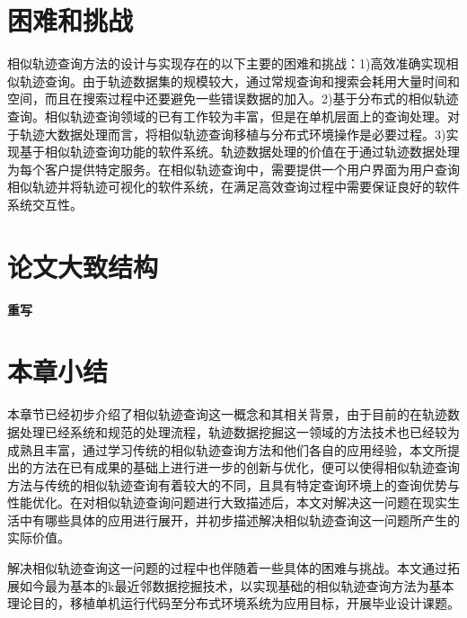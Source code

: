 \section{困难和挑战}
\label{sec:difficulty}
相似轨迹查询方法的设计与实现存在的以下主要的困难和挑战：1)高效准确实现相似轨迹查询。由于轨迹数据集的规模较大，通过常规查询和搜索会耗用大量时间和空间，而且在搜索过程中还要避免一些错误数据的加入。2)基于分布式的相似轨迹查询。相似轨迹查询领域的已有工作较为丰富，但是在单机层面上的查询处理。对于轨迹大数据处理而言，将相似轨迹查询移植与分布式环境操作是必要过程。3)实现基于相似轨迹查询功能的软件系统。轨迹数据处理的价值在于通过轨迹数据处理为每个客户提供特定服务。在相似轨迹查询中，需要提供一个用户界面为用户查询相似轨迹并将轨迹可视化的软件系统，在满足高效查询过程中需要保证良好的软件系统交互性。

\section{论文大致结构}
\label{sec:requirements}
\textbf{重写}
\\

\section{本章小结}
\label{sec:requirements}
本章节已经初步介绍了相似轨迹查询这一概念和其相关背景，由于目前的在轨迹数据处理已经系统和规范的处理流程，轨迹数据挖掘这一领域的方法技术也已经较为成熟且丰富，通过学习传统的相似轨迹查询方法和他们各自的应用经验，本文所提出的方法在已有成果的基础上进行进一步的创新与优化，便可以使得相似轨迹查询方法与传统的相似轨迹查询有着较大的不同，且具有特定查询环境上的查询优势与性能优化。在对相似轨迹查询问题进行大致描述后，本文对解决这一问题在现实生活中有哪些具体的应用进行展开，并初步描述解决相似轨迹查询这一问题所产生的实际价值。

解决相似轨迹查询这一问题的过程中也伴随着一些具体的困难与挑战。本文通过拓展如今最为基本的k最近邻数据挖掘技术，以实现基础的相似轨迹查询方法为基本理论目的，移植单机运行代码至分布式环境系统为应用目标，开展毕业设计课题。


